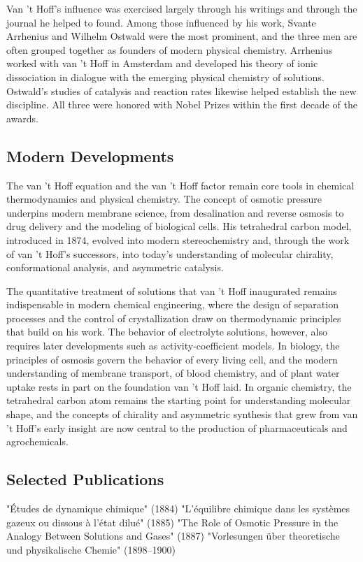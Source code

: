 Van 't Hoff's influence was exercised largely through his writings and through the journal he helped to found. Among those influenced by his work, Svante Arrhenius and Wilhelm Ostwald were the most prominent, and the three men are often grouped together as founders of modern physical chemistry. Arrhenius worked with van 't Hoff in Amsterdam and developed his theory of ionic dissociation in dialogue with the emerging physical chemistry of solutions. Ostwald's studies of catalysis and reaction rates likewise helped establish the new discipline. All three were honored with Nobel Prizes within the first decade of the awards.

\subsection*{Modern Developments}

The van 't Hoff equation and the van 't Hoff factor remain core tools in chemical thermodynamics and physical chemistry. The concept of osmotic pressure underpins modern membrane science, from desalination and reverse osmosis to drug delivery and the modeling of biological cells. His tetrahedral carbon model, introduced in 1874, evolved into modern stereochemistry and, through the work of van 't Hoff's successors, into today's understanding of molecular chirality, conformational analysis, and asymmetric catalysis.

The quantitative treatment of solutions that van 't Hoff inaugurated remains indispensable in modern chemical engineering, where the design of separation processes and the control of crystallization draw on thermodynamic principles that build on his work. The behavior of electrolyte solutions, however, also requires later developments such as activity-coefficient models. In biology, the principles of osmosis govern the behavior of every living cell, and the modern understanding of membrane transport, of blood chemistry, and of plant water uptake rests in part on the foundation van 't Hoff laid. In organic chemistry, the tetrahedral carbon atom remains the starting point for understanding molecular shape, and the concepts of chirality and asymmetric synthesis that grew from van 't Hoff's early insight are now central to the production of pharmaceuticals and agrochemicals.

\subsection*{Selected Publications}

"Études de dynamique chimique" (1884)
"L'équilibre chimique dans les systèmes gazeux ou dissous à l'état dilué" (1885)
"The Role of Osmotic Pressure in the Analogy Between Solutions and Gases" (1887)
"Vorlesungen über theoretische und physikalische Chemie" (1898--1900)

